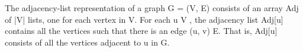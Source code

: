 \documentclass[preview]{standalone}
\begin{document}
\begin{center}
The adjacency-list representation of a graph G = (V, E) consists of an array Adj of |V| lists, one for each vertex in V. For each u \in V , the adjacency list Adj[u] contains all the vertices such that there is an edge (u, v) \in E. That is, Adj[u] consists of all the vertices adjacent to u in G.
\end{center}
\end{document}
